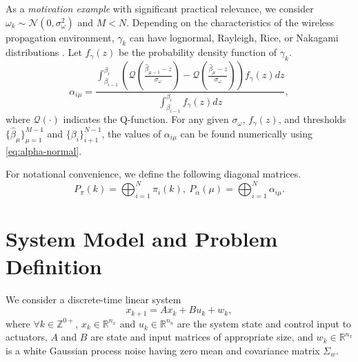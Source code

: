 \documentclass[journal,twoside,web]{ieeecolor}
\begin{document}
As a \emph{motivation example} with significant practical relevance, we consider $\omega_k \sim \mathcal{N}(0,\sigma_{\omega}^2)$ and $M<N$. 
Depending on the characteristics of the wireless propagation environment, $\gamma_k$ can have lognormal, Rayleigh, Rice, or Nakagami distributions \cite{stuber2017principles}. 
Let $f_{\gamma}(z)$ be the probability density function of $\gamma_k$. %
\begin{equation}\label{eq:alpha-normal}
    \alpha_{i\mu} = \frac{
    \int_{\beta_{i-1}}^{\beta_{i}}\left(
    \mathcal{Q}\left(\frac{\hat{\beta}_{\mu-1}-z}{\sigma_{\omega}}\right) - 
    \mathcal{Q}\left(\frac{\hat{\beta}_{\mu}-z}{\sigma_{\omega}}\right) 
    \right) f_{\gamma}(z)dz}{
    \int_{\beta_{i-1}}^{\beta_{i}} f_{\gamma}(z)dz},
\end{equation}
where $\mathcal{Q}(\cdot)$ indicates the Q-function. For any given $\sigma_{\omega}$, $f_{\gamma}(z)$, and %
thresholds $\{\hat{\beta}_{\mu}\}_{\mu=1}^{M-1}$ and $\{\beta_{i}\}_{i+1}^{N-1}$, the values of $\alpha_{i\mu}$ can be found numerically using \eqref{eq:alpha-normal}.

For notational convenience, we define the following diagonal matrices.
\begin{equation}\label{eq:epm}
     P_{\pi}^{}(k) = \bigoplus_{i=1}^{N} \pi_{i}(k),~P_{\alpha}^{}(\mu) = \bigoplus_{i=1}^{N} \alpha_{i\mu}.
\end{equation}

\section{System Model and Problem Definition}\label{sec:model}
We consider a discrete-time linear system %
\begin{equation}\label{eq:state}
        x_{k+1} = A x_{k} + B u_{k}^{} + w_{k},
\end{equation}
where $\forall k \!\in\! \mathbb{Z}^{0+}$, $x_k\!\in\!\mathbb{R}^{n_x}$ and $u_k^{}\!\in\!\mathbb{R}^{n_u}$ are the system state and control input to actuators, $A$ and $B$ are state and input matrices of appropriate size, and $w_k\!\in\!\mathbb{R}^{n_x}$ is a white Gaussian process noise having zero mean and covariance matrix $\Sigma_w$.
\end{document}
